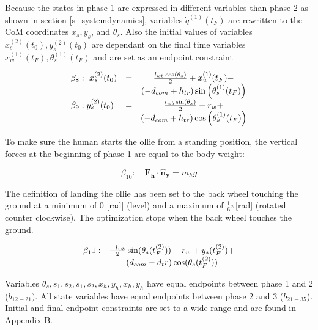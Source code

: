\documentclass[default,iicol]{sn-jnl}
\begin{document}
Because the states in phase 1 are expressed in different variables than phase 2 as shown in section \ref{s_systemdynamics}, variables $\dot q^{(1)}(t_F)$ are rewritten to the CoM coordinates $x_s,y_s$, and $\theta_s$. Also the initial values of variables $x_s^{(2)}(t_0), y_s^{(2)}(t_0)$ are dependant on the final time variables $x_w^{(1)}(t_F), \theta_s^{(1)}(t_F)$ and are set as an endpoint constraint

\begin{equation}
\begin{array}{l c c}
\beta_8: \ x_s^{(2)}(t_0) & = & \frac{l_{w b} \cos \left(\theta_s\right)}{2}+x_w^{(1)}(t_F)- \\ 
& & \left(-d_{c o m}+h_{t r}\right) \sin \left(\theta_s^{(1)}(t_F)\right) \\

\beta_9: y_s^{(2)}(t_0) & = & \frac{l_{w b} \sin \left(\theta_s\right)}{2}+r_w+ \\ 
& & \left(-d_{c o m}+h_{t r}\right) \cos \left(\theta_s^{(1)}(t_F)\right)
\end{array}
\end{equation}

To make sure the human starts the ollie from a standing position, the vertical forces at the beginning of phase 1 are equal to the body-weight:

\begin{equation}
    \beta_10: \quad \mathbf{F_h} \cdot \mathbf{\hat n_y} = m_h g
\end{equation}

The definition of landing the ollie has been set to the back wheel touching the ground at a minimum of 0 [rad] (level) and a maximum of $\frac{1}{6} \pi$[rad] (rotated counter clockwise). The optimization stops when the back wheel touches the ground.

\begin{equation}
\begin{array}{l c}
\beta_11 : & \frac{-l_{wb}}{2} \sin(\theta_s(t_F^{(2)})) - r_w + y_s(t_F^{(2)}) + \\ 
& (d_{com} - {d_tr}) \cos(\theta_s(t_F^{(2)}))
\end{array}
\end{equation}

Variables $\theta_s, s_1, s_2, \dot s_1, \dot s_2, x_h, y_h, \dot x_h, \dot y_h$ have equal endpoints between phase 1 and 2 ($b_{12-21})$. All state variables have equal endpoints between phase 2 and 3 ($b_{21-35}$). Initial and final endpoint constraints are set to a wide range and are found in Appendix B.
\end{document}

